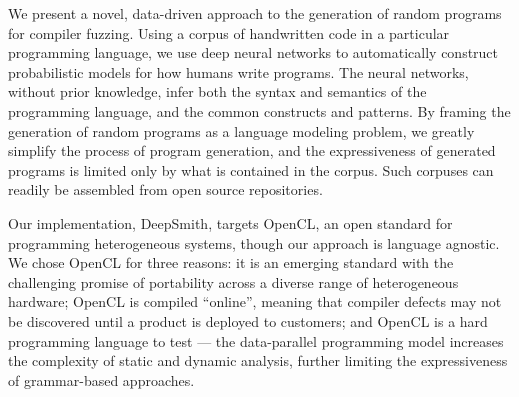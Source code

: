 
We present a novel, data-driven approach to the generation of random programs for compiler fuzzing. Using a corpus of handwritten code in a particular programming language, we use deep neural networks to automatically construct probabilistic models for how humans write programs. The neural networks, without prior knowledge, infer both the syntax and semantics of the programming language, and the common constructs and patterns. By framing the generation of random programs as a language modeling problem, we greatly simplify the process of program generation, and the expressiveness of generated programs is limited only by what is contained in the corpus. Such corpuses can readily be assembled from open source repositories.


Our implementation, DeepSmith, targets OpenCL, an open standard for programming heterogeneous systems, though our approach is language agnostic. We chose OpenCL for three reasons: it is an emerging standard with the challenging promise of portability across a diverse range of heterogeneous hardware; OpenCL is compiled ``online'', meaning that compiler defects may not be discovered until a product is deployed to customers; and OpenCL is a hard programming language to test --- the data-parallel programming model increases the complexity of static and dynamic analysis, further limiting the expressiveness of grammar-based approaches.

